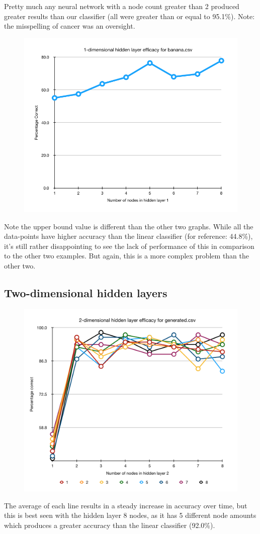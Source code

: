 \documentclass[12pt]{extarticle}
\begin{document}
Pretty much any neural network with a node count greater than 2 produced greater results than our classifier (all were greater than or equal to 95.1\%). Note: the misspelling of cancer was an oversight.

\begin{figure}[H]
\centering
\includegraphics[width=0.6\linewidth]{banana-1d}
\end{figure}

Note the upper bound value is different than the other two graphs. While all the data-points have higher accuracy than the linear classifier (for reference: 44.8\%), it's still rather disappointing to see the lack of performance of this in comparison to the other two examples. But again, this is a more complex problem than the other two.

\subsection{Two-dimensional hidden layers}

\begin{figure}[H]
\centering
\includegraphics[width=0.6\linewidth]{generated-2d}
\end{figure}

The average of each line results in a steady increase in accuracy over time, but this is best seen with the hidden layer 8 nodes, as it has 5 different node amounts which produces a greater accuracy than the linear classifier (92.0\%).
\end{document}
